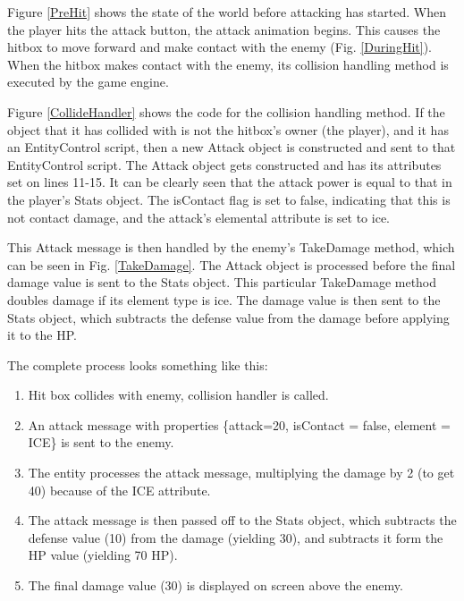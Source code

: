 \documentclass{article}
\begin{document}
Figure \ref{PreHit} shows the state of the world before attacking has started.  When the player hits the attack button, the attack animation begins.  This causes the hitbox to move forward and make contact with the enemy (Fig. \ref{DuringHit}).  When the hitbox makes contact with the enemy, its collision handling method is executed by the game engine.

Figure \ref{CollideHandler} shows the code for the collision handling method.  If the object that it has collided with is not the hitbox's owner (the player), and it has an EntityControl script, then a new Attack object is constructed and sent to that EntityControl script.  The Attack object gets constructed and has its attributes set on lines 11-15.  It can be clearly seen that the attack power is equal to that in the player's Stats object.  The isContact flag is set to false, indicating that this is not contact damage, and the attack's elemental attribute is set to ice.

This Attack message is then handled by the enemy's TakeDamage method, which can be seen in Fig. \ref{TakeDamage}.  The Attack object is processed before the final damage value is sent to the Stats object.  This particular TakeDamage method doubles damage if its element type is ice.  The damage value is then sent to the Stats object, which subtracts the defense value from the damage before applying it to the HP.

The complete process looks something like this:
\begin{enumerate}

\item Hit box collides with enemy, collision handler is called.
\item An attack message with properties \{attack=20, isContact = false, element = ICE\} is sent to the enemy.
\item The entity processes the attack message, multiplying the damage by 2 (to get 40) because of the ICE attribute.
\item The attack message is then passed off to the Stats object, which subtracts the defense value (10) from the damage (yielding 30), and subtracts it form the HP value (yielding 70 HP).
\item The final damage value (30) is displayed on screen  above the enemy.

\end{enumerate}
\end{document}
